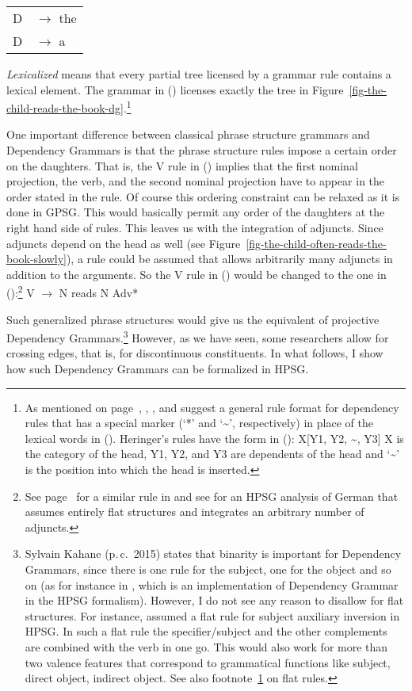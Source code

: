 \begin{tabular}[t]{@{}l@{ }l}
{D}  & {$\to$ the}\\
{D}  & {$\to$ a}\\
\end{tabular}
\z
\emph{Lexicalized}  means that every partial tree licensed by a grammar rule contains a lexical element.
The grammar in () licenses exactly the tree in
Figure~\ref{fig-the-child-reads-the-book-dg}.\footnote{\label{fn-flat-dg-rules}%
As mentioned on page~\pageref{page-rule-format-dg}, \citet[]{Gaifman65a}, \citet[]{Hays64a-u}, \citet[]{Baumgaertner70a} and \citet[]{Heringer96a-u} suggest a
general rule format for dependency rules that has a special marker (`*' and `\textasciitilde', respectively) in place of the lexical words in (). Heringer's rules have the
form in ():
\ea
X[Y1, Y2, \textasciitilde, Y3]
\z
X is the category of the head, Y1, Y2, and Y3 are dependents of the head and `\textasciitilde' is the position into
which the head is inserted.
}

One important difference between classical phrase structure grammars and Dependency Grammars is that the
phrase structure rules impose a certain order on the daughters. That is, the V rule in ()
implies that the first nominal projection, the verb, and the second nominal projection have to
appear in the order stated in the rule. Of course this ordering constraint can be relaxed as it is
done in GPSG. This would basically permit any order of the daughters at the right hand side of
rules.
This leaves us with the integration of adjuncts. Since adjuncts depend on the head as well (see
Figure~\vref{fig-the-child-often-reads-the-book-slowly}), a rule could be assumed that allows
arbitrarily many adjuncts in addition to the arguments. So the V rule in () would be changed
to the one in ():\footnote{
  See page~\pageref{adv-metarule} for a similar rule in \gpsg and see \citet{Kasper94a} for an HPSG
analysis of German that assumes entirely flat structures and integrates an arbitrary number of adjuncts.
}
\ea
V $\to$ N reads N Adv*
\z 


Such generalized phrase structures would give us the equivalent of projective Dependency
Grammars.\footnote{\label{fn-dg-binary-branching}%
Sylvain Kahane (p.\,c.\, 2015) states that binarity is important for Dependency Grammars, since
there is one rule for the subject, one for the object and so on (as for instance in
\citealp{Kahane2009a}, which is an implementation of Dependency Grammar in the HPSG formalism). However, I do not see any reason
to disallow for flat structures. For instance, \citet[]{GSag2000a-u} assumed a flat rule for subject
auxiliary inversion in HPSG. In such a flat rule the specifier/subject and the other complements are
combined with the verb in one go. This would also work for more than two valence features that correspond
to grammatical functions like subject, direct object, indirect object. See also
footnote~\ref{fn-flat-dg-rules} on flat rules.
} However, as we have seen, some researchers allow for crossing edges, that is, for
discontinuous constituents. In what follows, I show how such Dependency Grammars can be formalized in
HPSG.

